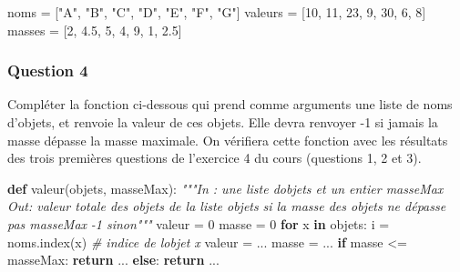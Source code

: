 \documentclass[
  paper=a4,
  ,captions=tableheading
]{scrartcl}
\newenvironment{Shaded}{}{}
\newcommand{\CommentTok}[1]{\textcolor[rgb]{0.38,0.63,0.69}{\textit{#1}}}
\newcommand{\ControlFlowTok}[1]{\textcolor[rgb]{0.00,0.44,0.13}{\textbf{#1}}}
\newcommand{\DecValTok}[1]{\textcolor[rgb]{0.25,0.63,0.44}{#1}}
\newcommand{\FloatTok}[1]{\textcolor[rgb]{0.25,0.63,0.44}{#1}}
\newcommand{\KeywordTok}[1]{\textcolor[rgb]{0.00,0.44,0.13}{\textbf{#1}}}
\newcommand{\NormalTok}[1]{#1}
\newcommand{\OperatorTok}[1]{\textcolor[rgb]{0.40,0.40,0.40}{#1}}
\newcommand{\StringTok}[1]{\textcolor[rgb]{0.25,0.44,0.63}{#1}}
\begin{document}
\begin{Shaded}
\begin{Highlighting}[]
\NormalTok{noms }\OperatorTok{=}\NormalTok{ [}\StringTok{"A"}\NormalTok{, }\StringTok{"B"}\NormalTok{, }\StringTok{"C"}\NormalTok{, }\StringTok{"D"}\NormalTok{, }\StringTok{"E"}\NormalTok{, }\StringTok{"F"}\NormalTok{, }\StringTok{"G"}\NormalTok{]}
\NormalTok{valeurs }\OperatorTok{=}\NormalTok{ [}\DecValTok{10}\NormalTok{, }\DecValTok{11}\NormalTok{, }\DecValTok{23}\NormalTok{, }\DecValTok{9}\NormalTok{, }\DecValTok{30}\NormalTok{, }\DecValTok{6}\NormalTok{, }\DecValTok{8}\NormalTok{]}
\NormalTok{masses }\OperatorTok{=}\NormalTok{ [}\DecValTok{2}\NormalTok{, }\FloatTok{4.5}\NormalTok{, }\DecValTok{5}\NormalTok{, }\DecValTok{4}\NormalTok{, }\DecValTok{9}\NormalTok{, }\DecValTok{1}\NormalTok{, }\FloatTok{2.5}\NormalTok{]}
\end{Highlighting}
\end{Shaded}

\hypertarget{question-4}{%
\subsubsection{Question 4}\label{question-4}}

Compléter la fonction ci-dessous qui prend comme arguments une liste de
noms d'objets, et renvoie la valeur de ces objets. Elle devra renvoyer
-1 si jamais la masse dépasse la masse maximale. On vérifiera cette
fonction avec les résultats des trois premières questions de l'exercice
4 du cours (questions 1, 2 et 3).

\begin{Shaded}
\begin{Highlighting}[]
\KeywordTok{def}\NormalTok{ valeur(objets, masseMax):}
    \CommentTok{"""In : une liste d\textquotesingle{}objets et un entier masseMax}
\CommentTok{    Out: valeur totale des objets de la liste objets}
\CommentTok{         si la masse des objets ne dépasse pas masseMax}
\CommentTok{         {-}1 sinon"""}
\NormalTok{    valeur }\OperatorTok{=} \DecValTok{0}
\NormalTok{    masse }\OperatorTok{=} \DecValTok{0}
    \ControlFlowTok{for}\NormalTok{ x }\KeywordTok{in}\NormalTok{ objets:}
\NormalTok{        i }\OperatorTok{=}\NormalTok{ noms.index(x)  }\CommentTok{\# indice de l\textquotesingle{}objet x}
\NormalTok{        valeur }\OperatorTok{=}\NormalTok{ ...}
\NormalTok{        masse }\OperatorTok{=}\NormalTok{ ...}
    \ControlFlowTok{if}\NormalTok{ masse }\OperatorTok{\textless{}=}\NormalTok{ masseMax:}
        \ControlFlowTok{return}\NormalTok{ ...}
    \ControlFlowTok{else}\NormalTok{:}
        \ControlFlowTok{return}\NormalTok{ ...}
\end{Highlighting}
\end{Shaded}
\end{document}
